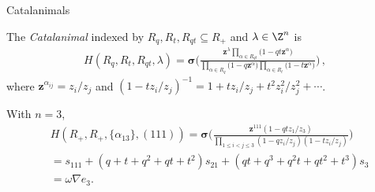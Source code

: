 \documentclass[dvipsnames,handout]{beamer}
\newcommand{\zz}{{\boldsymbol z}}
\newcommand{\sigmabold}{\boldsymbol \sigma}
\theoremstyle{definition}
\newcounter{c}
\begin{document}
\begin{frame}{Catalanimals}
  \begin{definition}
    The \emph{Catalanimal} indexed by $R_q, R_t, R_{qt} \subseteq R_+$
    and $\lambda \in \Z^n$ is \pause\vspace{-.4mm}
    \begin{align*}
      H(R_q,R_t,R_{qt},\lambda)
      = \sigmabold
      \bigg(\frac{\zz ^\lambda \prod_{\alpha \in
      R_{qt}} \big(1-q  t \zz ^\alpha \big)} {\prod_{\alpha \in R_q} \big(1-q \zz ^\alpha\big)
      \prod_{\alpha \in R_t} \big(1-t \zz ^\alpha\big)} 
      \bigg)\,,
    \end{align*}
   where \(\zz^{\alpha_{ij}} = z_i/z_j\) and \((1-t z_i/z_j)^{-1} =
   1+tz_i/z_j+t^2 z_i^2/z_j^2+\cdots\).
  \end{definition}
  \pause
With  $n=3$,
\vspace{-3mm}
\begin{align*}
& \displaystyle H(R_+,R_+,\{\alpha_{13}\}, (111)) =
\sigmabold \Big( \frac{\zz^{111} (1 - q t z_{1} /z_3)}
{\prod_{1\le i < j \le 3}(1 - q z_{i}/ z_{j})(1 - t z_{i}/ z_{j})} \Big)  \\
&  = s_{111} + (q+t+q^2+qt+t^2)s_{21}+ (qt + q^3+ q^2t + qt^2+t^3)s_{3} \\
& = \omega \nabla e_3.
\end{align*}
\vspace{4mm}
\end{frame}
\end{document}
